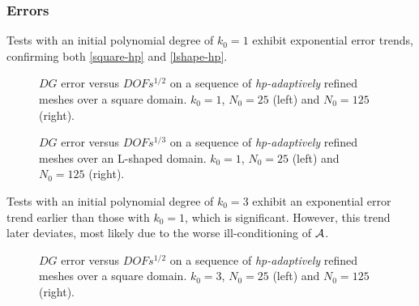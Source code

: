 \newpage
\subsubsection{Errors}

Tests with an initial polynomial degree of $k_0 = 1$ exhibit exponential error trends, confirming both \eqref{square-hp} and \eqref{lshape-hp}.

\begin{figure}[!ht]
    \begin{subfigure}[b]{0.45\textwidth}
		
	\end{subfigure}
	\hfill
	\begin{subfigure}[b]{0.45\textwidth}
		
	\end{subfigure}
    \caption{$DG$ error versus $DOFs^{1/2}$ on a sequence of \textit{hp-adaptively} refined meshes over a square domain. $k_0 = 1$, $N_0 = 25$ (left) and $N_0 = 125$ (right).}
\end{figure}

\begin{figure}[!ht]
    \begin{subfigure}[b]{0.45\textwidth}
		
	\end{subfigure}
	\hfill
	\begin{subfigure}[b]{0.45\textwidth}
		
	\end{subfigure}
    \caption{$DG$ error versus $DOFs^{1/3}$ on a sequence of \textit{hp-adaptively} refined meshes over an L-shaped domain. $k_0 = 1$, $N_0 = 25$ (left) and $N_0 = 125$ (right).}
\end{figure}

\newpage

Tests with an initial polynomial degree of $k_0 = 3$ exhibit an exponential error trend earlier than those with $k_0 = 1$, which is significant. However, this trend later deviates, most likely due to the worse ill-conditioning of $\mathcal{A}$.

\begin{figure}[!ht]
    \begin{subfigure}[b]{0.45\textwidth}
		
	\end{subfigure}
	\hfill
	\begin{subfigure}[b]{0.45\textwidth}
		
	\end{subfigure}
    \caption{$DG$ error versus $DOFs^{1/2}$ on a sequence of \textit{hp-adaptively} refined meshes over a square domain. $k_0 = 3$, $N_0 = 25$ (left) and $N_0 = 125$ (right).}
\end{figure}

